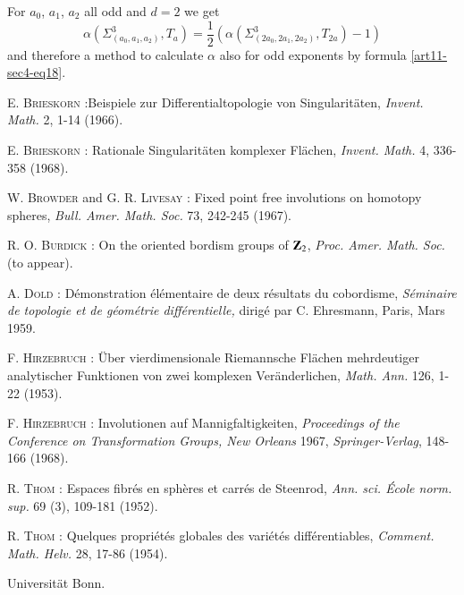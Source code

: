 For $a_{0}$, $a_{1}$, $a_{2}$ all odd and $d=2$ we get
$$
\alpha(\Sigma^{3}_{(a_{0},a_{1},a_{2})},T_{a})=\frac{1}{2}(\alpha(\Sigma^{3}_{(2a_{0},2a_{1},2a_{2})},T_{2a})-1)
$$
and therefore a method to calculate $\alpha$ also for odd exponents by formula \eqref{art11-sec4-eq18}.

\begin{thebibliography}{99}
 \textsc{E. Brieskorn :}\pageoriginale Beispiele zur Differentialtopologie von Singularit\"aten, {\em Invent. Math.} 2, 1-14 (1966).

 \textsc{E. Brieskorn :} Rationale Singularit\"aten komplexer Fl\"achen, {\em Invent. Math.} 4, 336-358 (1968).

 \textsc{W. Browder} and \textsc{G. R. Livesay :} Fixed point free involutions on homotopy spheres, {\em Bull. Amer. Math. Soc.} 73, 242-245 (1967).

 \textsc{R. O. Burdick :} On the oriented bordism groups of $\mathbf{Z}_{2}$, {\em Proc. Amer. Math. Soc.} (to appear).

 \textsc{A. Dold :} D\'emonstration \'el\'ementaire de deux r\'esultats du cobordisme, {\em S\'eminaire de topologie et de g\'eom\'etrie diff\'erentielle,} dirig\'e par C. Ehresmann, Paris, Mars 1959.

 \textsc{F. Hirzebruch :} \"Uber vierdimensionale Riemannsche Fl\"achen mehrdeutiger analytischer Funktionen von zwei komplexen Ver\"anderlichen, {\em Math. Ann.} 126, 1-22 (1953). 

 \textsc{F. Hirzebruch :} Involutionen auf Mannigfaltigkeiten, {\em Proceedings of the Conference on Transformation Groups, New Orleans} 1967, {\em Springer-Verlag}, 148-166 (1968).

 \textsc{R. Thom :} Espaces fibr\'es en sph\`eres et carr\'es de Steenrod, {\em Ann. sci. \'Ecole norm. sup.} 69 (3), 109-181 (1952).

 \textsc{R. Thom :} Quelques propri\'et\'es globales des vari\'et\'es diff\'erentiables, {\em Comment. Math. Helv.} 28, 17-86 (1954).
\end{thebibliography}

\bigskip
\noindent
Universit\"at Bonn.
